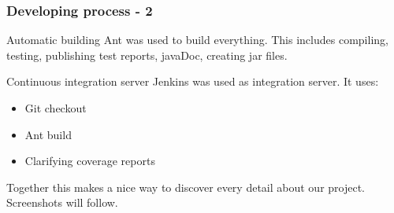 \documentclass{beamer}
\begin{document}
\begin{frame}
\frametitle{Developing process - 2}
\begin{block}{Automatic building}
    Ant was used to build everything. This includes compiling, testing,
    publishing test reports, javaDoc, creating jar files.
\end{block}
\begin{block}{Continuous integration server}
Jenkins was used as integration server. It uses:
\begin{itemize}
    \item Git checkout
    \item Ant build
    \item Clarifying coverage reports
\end{itemize}
Together this makes a nice way to discover every detail about our project.
Screenshots will follow.
\end{block}
\end{frame}

{
      \begin{frame}
      \end{frame}
}
\end{document}
